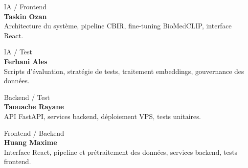 \documentclass[12pt,a4paper]{article}
\begin{document}
\begin{minipage}[t]{0.47\textwidth}
\begin{tcolorbox}[
  equal height group=team,
  colback=white, colframe=gray!50,
  boxrule=1pt, arc=5pt,
  left=8pt, right=8pt, top=8pt, bottom=8pt,
  borderline west={3pt}{0pt}{[HTML]{1E293B}}
]
{\small\textcolor[HTML]{64748B}{IA / Frontend}}\\[0.2cm]
\textbf{Taskin Ozan}\\[0.15cm]
{\small Architecture du système, pipeline CBIR,
fine-tuning BioMedCLIP, interface React.}
\end{tcolorbox}
\end{minipage}
\hfill
\begin{minipage}[t]{0.47\textwidth}
\begin{tcolorbox}[
  equal height group=team,
  colback=white, colframe=gray!50,
  boxrule=1pt, arc=5pt,
  left=8pt, right=8pt, top=8pt, bottom=8pt,
  borderline west={3pt}{0pt}{[HTML]{1E293B}}
]
{\small\textcolor[HTML]{64748B}{IA / Test}}\\[0.2cm]
\textbf{Ferhani Ales}\\[0.15cm]
{\small Scripts d'évaluation, stratégie de tests, traitement embeddings, gouvernance des données.}
\end{tcolorbox}
\end{minipage}

\vspace{1.2cm}

\begin{minipage}[t]{0.47\textwidth}
\begin{tcolorbox}[
  equal height group=team,
  colback=white, colframe=gray!50,
  boxrule=1pt, arc=5pt,
  left=8pt, right=8pt, top=8pt, bottom=8pt,
  borderline west={3pt}{0pt}{[HTML]{1E293B}}
]
{\small\textcolor[HTML]{64748B}{Backend / Test}}\\[0.2cm]
\textbf{Taouache Rayane}\\[0.15cm]
{\small API FastAPI, services backend, déploiement VPS, tests unitaires.}
\end{tcolorbox}
\end{minipage}
\hfill
\begin{minipage}[t]{0.47\textwidth}
\begin{tcolorbox}[
  equal height group=team,
  colback=white, colframe=gray!50,
  boxrule=1pt, arc=5pt,
  left=8pt, right=8pt, top=8pt, bottom=8pt,
  borderline west={3pt}{0pt}{[HTML]{1E293B}}
]
{\small\textcolor[HTML]{64748B}{Frontend / Backend}}\\[0.2cm]
\textbf{Huang Maxime}\\[0.15cm]
{\small Interface React, pipeline et prétraitement des données, services backend, tests frontend.}
\end{tcolorbox}
\end{minipage}
\end{document}
